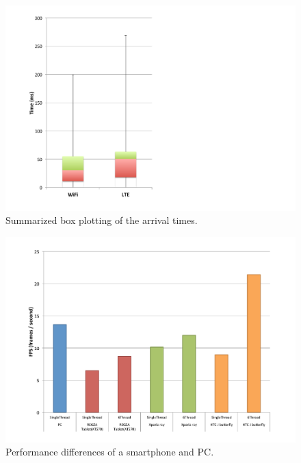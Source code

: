 \begin{figure}[!t]
 \centering
 \includegraphics[width=0.5\hsize]{fig/No13_TIPiC_boxplot_compare_WiFi_and_LTE.pdf}
 \caption{Summarized box plotting of the arrival times.}
 \label{fig:no13}
\end{figure}

\begin{figure}[!t]
 \centering
 \includegraphics[width=0.8\hsize]{fig/No14_Android_and_PC_benchmarck.pdf}
 \caption{Performance differences of a smartphone and PC.}
 \label{fig:no14}
\end{figure}
